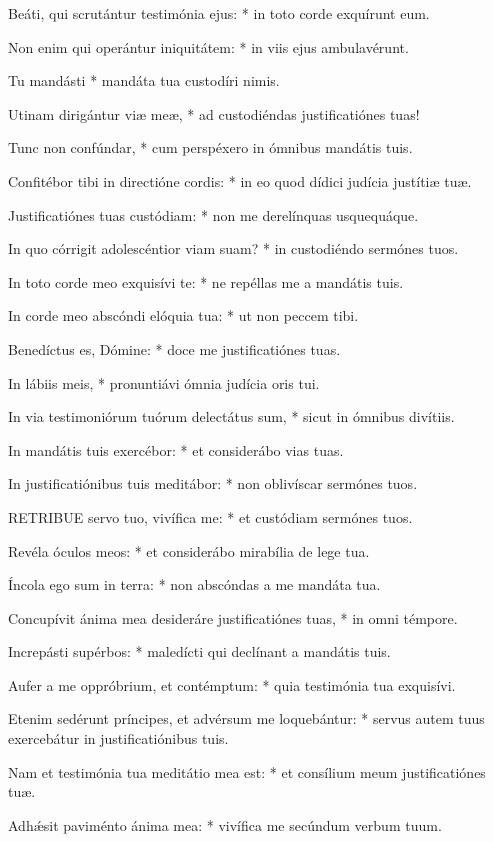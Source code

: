 Beáti, qui scrutántur testimónia ejus: * in toto corde exquírunt eum.

Non enim qui operántur iniquitátem: * in viis ejus ambulavérunt.

Tu mandásti * mandáta tua custodíri nimis.

Utinam dirigántur viæ meæ, * ad custodiéndas justificatiónes tuas!

Tunc non confúndar, * cum perspéxero in ómnibus mandátis tuis.

Confitébor tibi in directióne cordis: * in eo quod dídici judícia justítiæ tuæ.

Justificatiónes tuas custódiam: * non me derelínquas usquequáque.

In quo córrigit adolescéntior viam suam? * in custodiéndo sermónes tuos.

In toto corde meo exquisívi te: * ne repéllas me a mandátis tuis.

In corde meo abscóndi elóquia tua: * ut non peccem tibi.

Benedíctus es, Dómine: * doce me justificatiónes tuas.

In lábiis meis, * pronuntiávi ómnia judícia oris tui.

In via testimoniórum tuórum delectátus sum, * sicut in ómnibus divítiis.

In mandátis tuis exercébor: * et considerábo vias tuas.

In justificatiónibus tuis meditábor: * non oblivíscar sermónes tuos.


\lettrine[lines=2]{R}{ETRIBUE} servo tuo, vivífica me: * et custódiam sermónes tuos.

Revéla óculos meos: * et considerábo mirabília de lege tua.

Íncola ego sum in terra: * non abscóndas a me mandáta tua.

Concupívit ánima mea desideráre justificatiónes tuas, * in omni témpore.

Increpásti supérbos: * maledícti qui declínant a mandátis tuis.

Aufer a me oppróbrium, et contémptum: * quia testimónia tua exquisívi.

Etenim sedérunt príncipes, et advérsum me loquebántur: * servus autem tuus exercebátur in justificatiónibus tuis.

Nam et testimónia tua meditátio mea est: * et consílium meum justificatiónes tuæ.

Adhǽsit paviménto ánima mea: * vivífica me secúndum verbum tuum.

